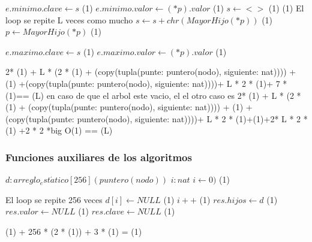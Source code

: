 {        \EndWhile
        \State $e.minimo.clave \gets s$                                 \comment \bigo(1)
        \State $e.minimo.valor \gets (*p).valor$                        \comment \bigo(1)
        \State $ s \gets <>$    \comment \bigo(1)
                                                \comment \bigo(1)
            \Statex             \comment El loop se repite L veces como mucho
            \State $s \gets s+chr(MayorHijo(*p))$                       \comment \bigo(1)
            \State $p \gets MayorHijo(*p)$                              \comment \bigo(1)

        \EndWhile
        \State $e.maximo.clave \gets s$                                 \comment \bigo(1)
        \State $e.maximo.valor \gets (*p).valor$                        \comment \bigo(1)

    \EndIf

}    {  2* \bigo(1) + L * (2 * \bigo(1) + \bigo(copy(tupla(punte: puntero(nodo), siguiente: nat)))) + \bigo(1) +\bigo(copy(tupla(punte: puntero(nodo), siguiente: nat))))+ L * 2 * \bigo(1)+ 7 * \bigo(1)== \bigo(L) en caso de que el arbol este vacio, el el otro caso es
2* \bigo(1) + L * (2 * \bigo(1) + \bigo(copy(tupla(punte: puntero(nodo), siguiente: nat)))) + \bigo(1) +\bigo(copy(tupla(punte: puntero(nodo), siguiente: nat))))+ L * 2 * \bigo(1)+\bigo(1)+2* L * 2 * \bigo(1) +2 * 2 *big O(1) == \bigo(L)}







\subsubsection{Funciones auxiliares de los algoritmos}

  {
    \var $d : arreglo_est\acute{a}tico[256] (puntero(nodo))$
    \var $i : nat$
    \State $i \gets 0)$                                                 \comment \bigo(1)

         \Statex             \comment El loop se repite 256 veces
         \State $d[i] \gets NULL$                                       \comment \bigo(1)
         \State $i++$                                                   \comment \bigo(1)
    \EndWhile
    \State $res.hijos \gets d$                                          \comment \bigo(1)
    \State $res.valor \gets NULL$                                       \comment \bigo(1)
    \State $res.clave \gets NULL$                                       \comment \bigo(1)
}{   \bigo(1) + 256 * (2 * \bigo(1)) + 3 * \bigo(1) = \bigo(1) }

